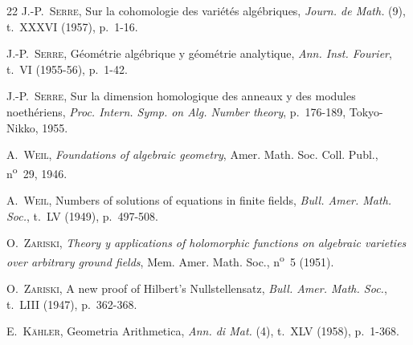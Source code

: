 \begin{thebibliography}{22}
J.-P.~\textsc{Serre},
Sur la cohomologie des variétés algébriques,
\emph{Journ. de Math.} (9), t.~XXXVI (1957), p.~1-16.

J.-P.~\textsc{Serre},
Géométrie algébrique y géométrie analytique,
\emph{Ann. Inst. Fourier}, t.~VI (1955-56), p.~1-42.

J.-P.~\textsc{Serre},
Sur la dimension homologique des anneaux y des modules noethériens,
\emph{Proc. Intern. Symp. on Alg. Number theory}, p.~176-189, Tokyo-Nikko,
1955.

A.~\textsc{Weil}, \emph{Foundations of algebraic geometry}, Amer. Math. Soc.
Coll. Publ., n\textsuperscript{o}~29, 1946.

A.~\textsc{Weil}, Numbers of solutions of equations in finite fields,
\emph{Bull. Amer. Math. Soc.}, t.~LV (1949), p.~497-508.

O.~\textsc{Zariski},
\emph{Theory y applications of holomorphic functions on algebraic varieties
over arbitrary ground fields}, Mem. Amer. Math. Soc., n\textsuperscript{o}~5
(1951).

O.~\textsc{Zariski}, A new proof of Hilbert's Nullstellensatz,
\emph{Bull. Amer. Math. Soc.}, t.~LIII (1947), p.~362-368.

E.~\textsc{Kähler}, Geometria Arithmetica,
\emph{Ann. di Mat.} (4), t.~XLV (1958), p.~1-368.

\end{thebibliography}
